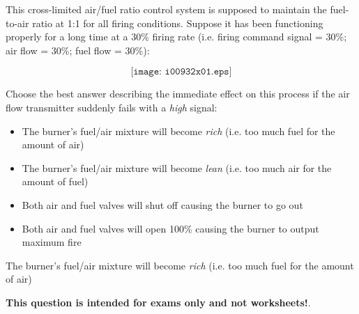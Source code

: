 

This cross-limited air/fuel ratio control system is supposed to maintain the fuel-to-air ratio at 1:1 for all firing conditions.  Suppose it has been functioning properly for a long time at a 30\% firing rate (i.e. firing command signal = 30\%; air flow = 30\%; fuel flow = 30\%):

$$\texttt{[image: i00932x01.eps]}$$

\noindent
Choose the best answer describing the immediate effect on this process if the air flow transmitter suddenly fails with a {\it high} signal:

\begin{itemize}
\item{} The burner's fuel/air mixture will become {\it rich} (i.e. too much fuel for the amount of air)
\vskip 10pt
\item{} The burner's fuel/air mixture will become {\it lean} (i.e. too much air for the amount of fuel)
\vskip 10pt
\item{} Both air and fuel valves will shut off causing the burner to go out
\vskip 10pt
\item{} Both air and fuel valves will open 100\% causing the burner to output maximum fire
\end{itemize}







The burner's fuel/air mixture will become {\it rich} (i.e. too much fuel for the amount of air)







{\bf This question is intended for exams only and not worksheets!}.




